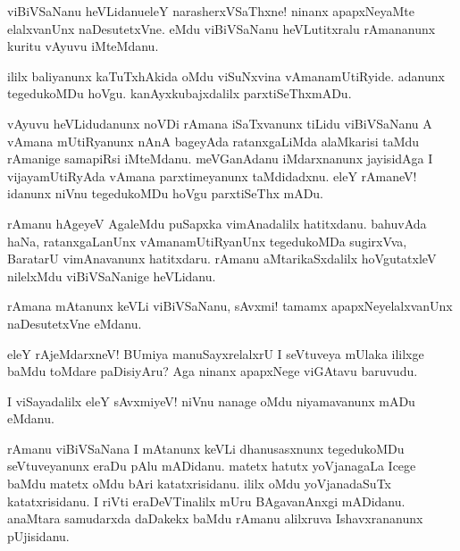 \begin{mng}
viBiVSaNanu heVLidanu\mdash eleY narasherxVSaThxne! ninanx apapxNeyaMte elalxvanUnx naDesutetxVne. eMdu viBiVSaNanu heVLutitxralu rAmananunx kuritu vAyuvu iMteMdanu.
\end{mng}

\begin{mng}
ililx baliyanunx kaTuTxhAkida oMdu viSuNxvina vAmanamUtiRyide. adanunx tegedukoMDu hoVgu. kanAyxkubajxdalilx parxtiSeThxmADu. 
\end{mng}

\begin{mng}
vAyuvu heVLidudanunx noVDi rAmana iSaTxvanunx tiLidu viBiVSaNanu A vAmana mUtiRyanunx nAnA bageyAda ratanxgaLiMda alaMkarisi taMdu rAmanige samapiRsi iMteMdanu. meVGanAdanu iMdarxnanunx jayisidAga I vijayamUtiRyAda vAmana parxtimeyanunx taMdidadxnu. eleY rAmaneV! idanunx niVnu tegedukoMDu hoVgu parxtiSeThx mADu.
\end{mng}

\begin{mng}
rAmanu hAgeyeV AgaleMdu puSapxka vimAnadalilx hatitxdanu. bahuvAda haNa, ratanxgaLanUnx vAmanamUtiRyanUnx tegedukoMDa sugirxVva, BaratarU vimAnavanunx hatitxdaru. rAmanu aMtarikaSxdalilx hoVgutatxleV nilelxMdu viBiVSaNanige heVLidanu.
\end{mng}

\begin{mng}
rAmana mAtanunx keVLi viBiVSaNanu, sAvxmi! tamamx apapxNeyelalxvanUnx naDesutetxVne eMdanu.
\end{mng}

\begin{mng}
eleY rAjeMdarxneV! BUmiya manuSayxrelalxrU I seVtuveya mUlaka ililxge baMdu toMdare paDisiyAru? Aga ninanx apapxNege viGAtavu baruvudu.
\end{mng}

\begin{mng}
I viSayadalilx eleY sAvxmiyeV! niVnu nanage oMdu niyamavanunx mADu eMdanu.
\end{mng}

\begin{mng}
rAmanu viBiVSaNana I mAtanunx keVLi dhanusasxnunx tegedukoMDu seVtuveyanunx eraDu pAlu mADidanu. matetx hatutx yoVjanagaLa Icege baMdu matetx oMdu bAri katatxrisidanu. ililx oMdu yoVjanadaSuTx katatxrisidanu. I riVti eraDeVTinalilx mUru BAgavanAnxgi mADidanu. anaMtara samudarxda daDakekx baMdu rAmanu alilxruva Ishavxrananunx pUjisidanu.
\end{mng}

